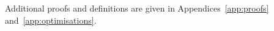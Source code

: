 \documentclass[acmsmall,review,anonymous,screen]{acmart}
\begin{document}
\noindent Additional proofs and definitions are given in Appendices~\ref{app:proofs}
and~\ref{app:optimisations}.

%
%






\end{document}
